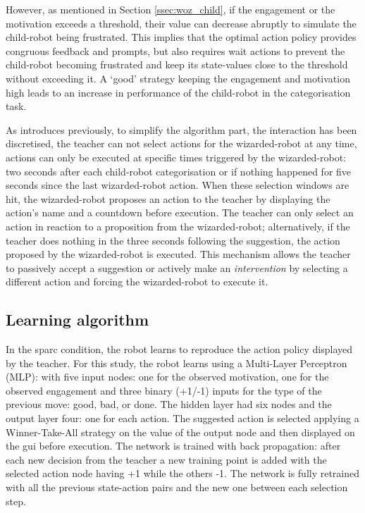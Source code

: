 However, as mentioned in Section \ref{ssec:woz_child}, if the engagement or the motivation exceeds a threshold, their value can decrease abruptly to simulate the child-robot being frustrated. This implies that the optimal action policy provides congruous feedback and prompts, but also requires wait actions to prevent the child-robot becoming frustrated and keep its state-values close to the threshold without exceeding it. A `good' strategy keeping the engagement and motivation high leads to an increase in performance of the child-robot in the categorisation task.

As introduces previously, to simplify the algorithm part, the interaction has been discretised, the teacher can not select actions for the wizarded-robot at any time, actions can only be executed at specific times triggered by the wizarded-robot: two seconds after each child-robot categorisation or if nothing happened for five seconds since the last wizarded-robot action. When these selection windows are hit, the wizarded-robot proposes an action to the teacher by displaying the action's name and a countdown before execution. The teacher can only select an action in reaction to a proposition from the wizarded-robot; alternatively, if the teacher does nothing in the three seconds following the suggestion, the action proposed by the wizarded-robot is executed. This mechanism allows the teacher to passively accept a suggestion or actively make an \emph{intervention} by selecting a different action and forcing the wizarded-robot to execute it.

\subsection{Learning algorithm}

In the \gls{sparc} condition, the robot learns to reproduce the action policy displayed by the teacher. For this study, the robot learns using a Multi-Layer Perceptron (MLP): with five input nodes: one for the observed motivation, one for the observed engagement and three binary (+1/-1) inputs for the type of the previous move: good, bad, or done. The hidden layer had six nodes and the output layer four: one for each action. The suggested action is selected applying a Winner-Take-All strategy on the value of the output node and then displayed on the \gls{gui} before execution. The network is trained with back propagation: after each new decision from the teacher a new training point is added with the selected action node having +1 while the others -1. The network is fully retrained with all the previous state-action pairs and the new one between each selection step. 

